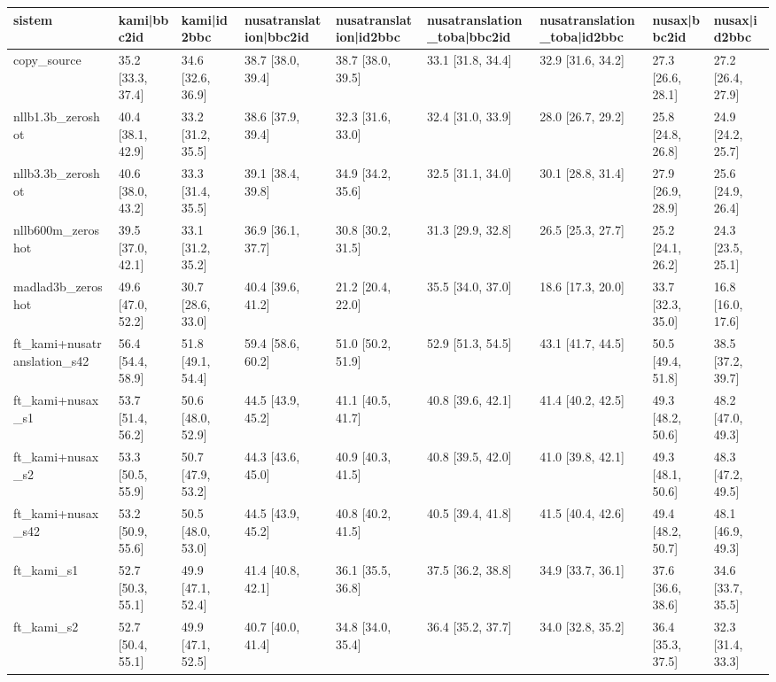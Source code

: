 \begin{tabular}{lllllllll}
\toprule
sistem & kami|bbc2id & kami|id2bbc & nusatranslation|bbc2id & nusatranslation|id2bbc & nusatranslation\_toba|bbc2id & nusatranslation\_toba|id2bbc & nusax|bbc2id & nusax|id2bbc \\
\midrule
copy\_source & 35.2 [33.3, 37.4] & 34.6 [32.6, 36.9] & 38.7 [38.0, 39.4] & 38.7 [38.0, 39.5] & 33.1 [31.8, 34.4] & 32.9 [31.6, 34.2] & 27.3 [26.6, 28.1] & 27.2 [26.4, 27.9] \\
nllb1.3b\_zeroshot & 40.4 [38.1, 42.9] & 33.2 [31.2, 35.5] & 38.6 [37.9, 39.4] & 32.3 [31.6, 33.0] & 32.4 [31.0, 33.9] & 28.0 [26.7, 29.2] & 25.8 [24.8, 26.8] & 24.9 [24.2, 25.7] \\
nllb3.3b\_zeroshot & 40.6 [38.0, 43.2] & 33.3 [31.4, 35.5] & 39.1 [38.4, 39.8] & 34.9 [34.2, 35.6] & 32.5 [31.1, 34.0] & 30.1 [28.8, 31.4] & 27.9 [26.9, 28.9] & 25.6 [24.9, 26.4] \\
nllb600m\_zeroshot & 39.5 [37.0, 42.1] & 33.1 [31.2, 35.2] & 36.9 [36.1, 37.7] & 30.8 [30.2, 31.5] & 31.3 [29.9, 32.8] & 26.5 [25.3, 27.7] & 25.2 [24.1, 26.2] & 24.3 [23.5, 25.1] \\
madlad3b\_zeroshot & 49.6 [47.0, 52.2] & 30.7 [28.6, 33.0] & 40.4 [39.6, 41.2] & 21.2 [20.4, 22.0] & 35.5 [34.0, 37.0] & 18.6 [17.3, 20.0] & 33.7 [32.3, 35.0] & 16.8 [16.0, 17.6] \\
ft\_kami+nusatranslation\_s42 & 56.4 [54.4, 58.9] & 51.8 [49.1, 54.4] & 59.4 [58.6, 60.2] & 51.0 [50.2, 51.9] & 52.9 [51.3, 54.5] & 43.1 [41.7, 44.5] & 50.5 [49.4, 51.8] & 38.5 [37.2, 39.7] \\
ft\_kami+nusax\_s1 & 53.7 [51.4, 56.2] & 50.6 [48.0, 52.9] & 44.5 [43.9, 45.2] & 41.1 [40.5, 41.7] & 40.8 [39.6, 42.1] & 41.4 [40.2, 42.5] & 49.3 [48.2, 50.6] & 48.2 [47.0, 49.3] \\
ft\_kami+nusax\_s2 & 53.3 [50.5, 55.9] & 50.7 [47.9, 53.2] & 44.3 [43.6, 45.0] & 40.9 [40.3, 41.5] & 40.8 [39.5, 42.0] & 41.0 [39.8, 42.1] & 49.3 [48.1, 50.6] & 48.3 [47.2, 49.5] \\
ft\_kami+nusax\_s42 & 53.2 [50.9, 55.6] & 50.5 [48.0, 53.0] & 44.5 [43.9, 45.2] & 40.8 [40.2, 41.5] & 40.5 [39.4, 41.8] & 41.5 [40.4, 42.6] & 49.4 [48.2, 50.7] & 48.1 [46.9, 49.3] \\
ft\_kami\_s1 & 52.7 [50.3, 55.1] & 49.9 [47.1, 52.4] & 41.4 [40.8, 42.1] & 36.1 [35.5, 36.8] & 37.5 [36.2, 38.8] & 34.9 [33.7, 36.1] & 37.6 [36.6, 38.6] & 34.6 [33.7, 35.5] \\
ft\_kami\_s2 & 52.7 [50.4, 55.1] & 49.9 [47.1, 52.5] & 40.7 [40.0, 41.4] & 34.8 [34.0, 35.4] & 36.4 [35.2, 37.7] & 34.0 [32.8, 35.2] & 36.4 [35.3, 37.5] & 32.3 [31.4, 33.3] \\

\end{tabular}
